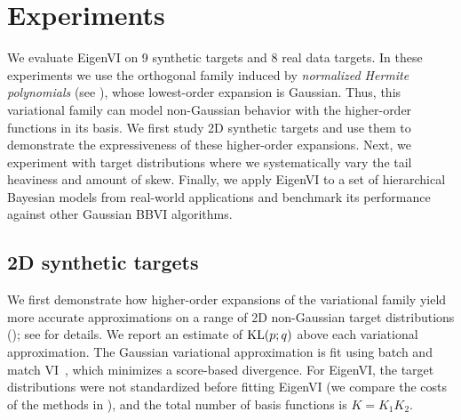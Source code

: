 
%

\vspace{-5pt}
\section{Experiments}
\label{sec:experiments}
\vspace{-3pt}


We evaluate EigenVI on 9 synthetic targets and 8 real data targets.
In these experiments we use the orthogonal family induced by
\emph{normalized Hermite polynomials} (see ),
whose lowest-order expansion is  Gaussian.
Thus, this variational family can model non-Gaussian behavior with the higher-order functions in its basis.
We first study 2D synthetic targets and use them to demonstrate the expressiveness of
these higher-order expansions.
Next, we experiment with target distributions where we systematically vary the tail heaviness and amount of skew.
Finally, we apply EigenVI to a set of hierarchical Bayesian models from real-world
applications and benchmark its performance against other Gaussian BBVI algorithms.

\subsection{2D synthetic targets}

We first demonstrate how higher-order expansions of the variational family
yield more accurate approximations on a range of 2D non-Gaussian target distributions
();
see  for details.
We report an estimate of $\text{KL}(p;q)$ above each variational approximation.
The Gaussian variational approximation is fit using batch and match VI~\citep{cai2024},
which minimizes a score-based divergence.
For EigenVI,
the target distributions were not standardized before fitting EigenVI
(we compare the costs of the methods in ),
and the total number of basis functions is $K\!=\!K_1 K_2$.
%

